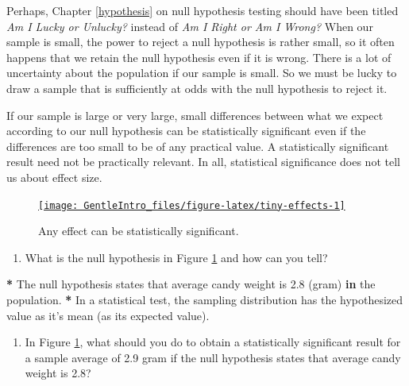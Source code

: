 \documentclass[a4paper]{book}
\newenvironment{Shaded}{\begin{snugshade}}{\end{snugshade}}
\newcommand{\FloatTok}[1]{\textcolor[rgb]{0.00,0.00,0.00}{#1}}
\newcommand{\StringTok}[1]{\textcolor[rgb]{0.00,0.00,0.00}{#1}}
\newcommand{\ControlFlowTok}[1]{\textcolor[rgb]{0.00,0.00,0.00}{\textbf{#1}}}
\newcommand{\OperatorTok}[1]{\textcolor[rgb]{0.00,0.00,0.00}{\textbf{#1}}}
\newcommand{\NormalTok}[1]{#1}
\providecommand{\tightlist}{%
  \setlength{\itemsep}{0pt}\setlength{\parskip}{0pt}}
\theoremstyle{definition}
\theoremstyle{definition}
\theoremstyle{definition}
\theoremstyle{remark}
\begin{document}
Perhaps, Chapter \ref{hypothesis} on null hypothesis testing should have
been titled \emph{Am I Lucky or Unlucky?} instead of \emph{Am I Right or
Am I Wrong?} When our sample is small, the power to reject a null
hypothesis is rather small, so it often happens that we retain the null
hypothesis even if it is wrong. There is a lot of uncertainty about the
population if our sample is small. So we must be lucky to draw a sample
that is sufficiently at odds with the null hypothesis to reject it.

If our sample is large or very large, small differences between what we
expect according to our null hypothesis can be statistically significant
even if the differences are too small to be of any practical value. A
statistically significant result need not be practically relevant. In
all, statistical significance does not tell us about effect size.

\begin{figure}[H]
\href{http://82.196.4.233:3838/apps/tiny-effects/}{\texttt{[image: GentleIntro\_files/figure-latex/tiny-effects-1]} }\caption{Any effect can be statistically significant.}\label{fig:tiny-effects}
\end{figure}

\begin{enumerate}
\def\labelenumi{\arabic{enumi}.}
\tightlist
\item
  What is the null hypothesis in Figure \ref{fig:tiny-effects} and how
  can you tell?
\end{enumerate}

\begin{Shaded}
\begin{Highlighting}[]
\OperatorTok{*}\StringTok{ }\NormalTok{The null hypothesis states that average candy weight is }\FloatTok{2.8}\NormalTok{ (gram) }\ControlFlowTok{in}\NormalTok{ the}
\NormalTok{population.}
\OperatorTok{*}\StringTok{ }\NormalTok{In a statistical test, the sampling distribution has the hypothesized value}
\NormalTok{as it}\StringTok{'s mean (as its expected value).}
\end{Highlighting}
\end{Shaded}

\begin{enumerate}
\def\labelenumi{\arabic{enumi}.}
\setcounter{enumi}{1}
\tightlist
\item
  In Figure \ref{fig:tiny-effects}, what should you do to obtain a
  statistically significant result for a sample average of 2.9 gram if
  the null hypothesis states that average candy weight is 2.8?
\end{enumerate}
\end{document}
